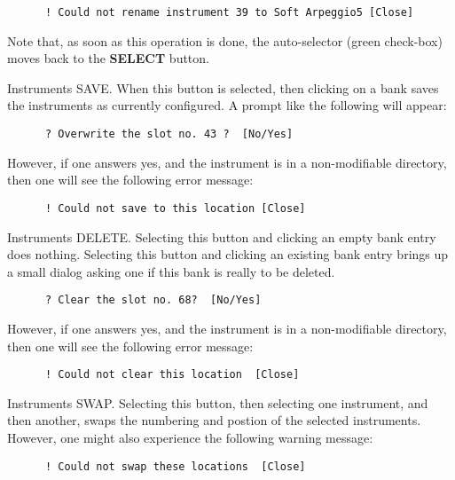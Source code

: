    \begin{verbatim}
      ! Could not rename instrument 39 to Soft Arpeggio5 [Close]
   \end{verbatim}

   Note that, as soon as this operation is done, the auto-selector (green
   check-box) moves back to the \textbf{SELECT} button.

   Instruments SAVE.
   When this button is selected, then clicking on a bank saves
   the instruments as currently configured.
   A prompt like the following will appear:

   \begin{verbatim}
      ? Overwrite the slot no. 43 ?  [No/Yes]
   \end{verbatim}

   However, if one answers yes, and the instrument is in a non-modifiable
   directory, then one will see the following error message:

   \begin{verbatim}
      ! Could not save to this location [Close]
   \end{verbatim}

   Instruments DELETE.
   Selecting this button and clicking an empty bank entry does nothing.
   Selecting this button and clicking an existing bank entry brings up a
   small dialog asking one if this bank is really to be deleted.

   \begin{verbatim}
      ? Clear the slot no. 68?  [No/Yes]
   \end{verbatim}

   However, if one answers yes, and the instrument is in a non-modifiable
   directory, then one will see the following error message:

   \begin{verbatim}
      ! Could not clear this location  [Close]
   \end{verbatim}

   Instruments SWAP.
   Selecting this button, then selecting one instrument, and then another,
   swaps the numbering and postion of the selected instruments.
   However, one might also experience the following warning message:

   \begin{verbatim}
      ! Could not swap these locations  [Close]
   \end{verbatim}

